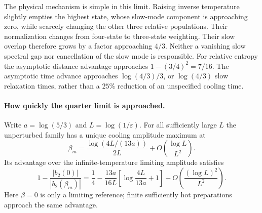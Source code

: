 \documentclass[11pt]{article}
\begin{document}
The physical mechanism is simple in this limit. Raising inverse temperature
slightly empties the highest state, whose slow-mode component is approaching
zero, while scarcely changing the other three relative populations. Their
normalization changes from four-state to three-state weighting. Their slow
overlap therefore grows by a factor approaching $4/3$. Neither a vanishing
slow spectral gap nor cancellation of the slow mode is responsible. For
relative entropy the asymptotic distance advantage approaches
$1-(3/4)^2=7/16$. The asymptotic time advance approaches
$\log(4/3)/3$, or $\log(4/3)$ slow relaxation times, rather than a $25\%$
reduction of an unspecified cooling time.

\paragraph{How quickly the quarter limit is approached.}
Write $a=\log(5/3)$ and $L=\log(1/\varepsilon)$. For all sufficiently large
$L$ the unperturbed family has a unique cooling amplitude maximum at
\[
\beta_m=\frac{\log(4L/(13a))}{2L}
+O\!\left(\frac{\log L}{L^2}\right).
\]
Its advantage over the infinite-temperature limiting amplitude satisfies
\begin{equation}\label{eq:quarterapproach}
1-\frac{|b_2(0)|}{|b_2(\beta_m)|}
=\frac14-\frac{13a}{16L}
 \left[\log\frac{4L}{13a}+1\right]
+O\!\left(\frac{(\log L)^2}{L^2}\right).
\end{equation}
Here $\beta=0$ is only a limiting reference; finite sufficiently hot
preparations approach the same advantage.
\end{document}
